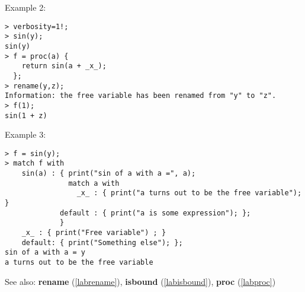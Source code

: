 \noindent Example 2: 
\begin{center}\begin{minipage}{15cm}\begin{Verbatim}[frame=single]
> verbosity=1!;
> sin(y);
sin(y)
> f = proc(a) {
    return sin(a + _x_);
  };
> rename(y,z);
Information: the free variable has been renamed from "y" to "z".
> f(1);
sin(1 + z)
\end{Verbatim}
\end{minipage}\end{center}
\noindent Example 3: 
\begin{center}\begin{minipage}{15cm}\begin{Verbatim}[frame=single]
> f = sin(y);
> match f with
    sin(a) : { print("sin of a with a =", a);
               match a with
                 _x_ : { print("a turns out to be the free variable"); }
             default : { print("a is some expression"); };
             }
    _x_ : { print("Free variable") ; }
    default: { print("Something else"); };
sin of a with a = y
a turns out to be the free variable
\end{Verbatim}
\end{minipage}\end{center}
See also: \textbf{rename} (\ref{labrename}), \textbf{isbound} (\ref{labisbound}), \textbf{proc} (\ref{labproc})
